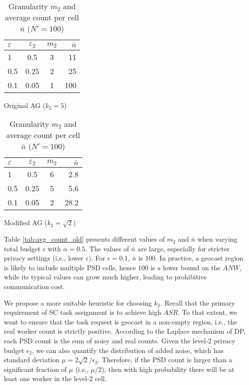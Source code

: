 \documentclass{USC-Thesis}
\numberwithin{equation}{chapter}
\begin{document}
\begin{table}[!htb]
    \begin{subtable}{.5\linewidth}
      \centering
		\begin{tabular}{ l | c | c | r }
		\hline
		$\varepsilon$ & \textbf{$\varepsilon_2$} & \textbf{$m_2$} & \textbf{$\bar{n}$} \\
		\hline
		{1} & 0.5 & 3 & 11 \\
		\hline
		{0.5} & 0.25 & 2 & 25 \\
		\hline
		{0.1} & 0.05 & 1 & 100 \\
		\hline
		\end{tabular}
		\caption{Original AG ($k_2=5$)}
		\label{tab:avg_count_old}
    \end{subtable}
    \begin{subtable}{.5\linewidth}
      \centering
		\begin{tabular}{ l | c | c | r }
		\hline
		$\varepsilon$ & \textbf{$\varepsilon_2$} & \textbf{$m_2$} & \textbf{$\bar{n}$} \\
		\hline
		{1} & 0.5 & 6 & 2.8 \\
		\hline
		{0.5} & 0.25 & 5 & 5.6 \\
		\hline
		{0.1} & 0.05 & 2 & 28.2 \\
		\hline
		\end{tabular}
		\caption{Modified AG ($k_2=\sqrt{2}$)}
		\label{tab:avg_count_new}
    \end{subtable} 
    \caption{Granularity $m_2$ and average count per cell $\bar{n}$ ($N'=100$)}
    \label{tab:avg_count}
\end{table}

Table \ref{tab:avg_count_old} presents different values of $m_2$ and $\bar{n}$ when varying total budget $\epsilon$ with $\alpha=0.5$. The values of $\bar{n}$ are large, especially for stricter privacy settings (i.e., lower $\epsilon$). For $\epsilon=0.1$, $\bar{n}$ is $100$. In practice, a geocast region is likely to include multiple PSD cells, hence $100$ is a lower bound on the $\mathit{ANW}$, while its typical values can grow much higher, leading to prohibitive communication cost. 

We propose a more suitable heuristic for choosing $k_2$. Recall that the primary requirement of SC task assignment is to achieve high $\mathit{ASR}$. To that extent, we want to ensure that the task request is geocast in a non-empty region, i.e., the real worker count is strictly positive. According to the Laplace mechanism of DP, each PSD count is the sum of noisy and real counts. Given the level-$2$ privacy budget $\epsilon_2$, we can also quantify the distribution of added noise, which has standard deviation $\mu=2\sqrt{2}/\epsilon_2$. Therefore, if the PSD count is larger than a significant fraction of $\mu$ (i.e., $\mu/2$), then with high probability there will be at least one worker in the level-$2$ cell.
\end{document}
